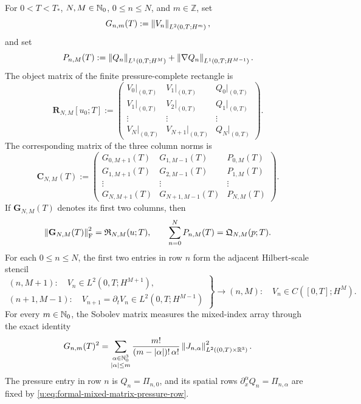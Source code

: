 \begin{proposition}
\label{u:prop:sobolev-rectangle-matrix}
For \(0<T<T_*\), \(N,M\in\mathbb N_0\), \(0\le n\le N\), and
\(m\in\mathbb Z\), set
\[
 G_{n,m}(T):=\left\lVert V_n\right\rVert_{L^2(0,T;H^m)},
\]
and set
\[
 P_{n,M}(T):=\left\lVert Q_n\right\rVert_{L^1(0,T;H^M)}
 +\left\lVert \nabla Q_n\right\rVert_{L^1(0,T;H^{M-1})}.
\]
The object matrix of the finite pressure-complete rectangle is
\begin{equation}
 \mathbf R_{N,M}[u_0;T]
 :=
 \begin{pmatrix}
  V_0|_{(0,T)}&V_1|_{(0,T)}&Q_0|_{(0,T)}\\
  V_1|_{(0,T)}&V_2|_{(0,T)}&Q_1|_{(0,T)}\\
  \vdots&\vdots&\vdots\\
  V_N|_{(0,T)}&V_{N+1}|_{(0,T)}&Q_N|_{(0,T)}
 \end{pmatrix}.
 \label{u:eq:finite-rectangle-object-matrix}
\end{equation}
The corresponding matrix of the three column norms is
\begin{equation}
 \mathbf C_{N,M}(T)
 :=
 \begin{pmatrix}
  G_{0,M+1}(T)&G_{1,M-1}(T)&P_{0,M}(T)\\
  G_{1,M+1}(T)&G_{2,M-1}(T)&P_{1,M}(T)\\
  \vdots&\vdots&\vdots\\
  G_{N,M+1}(T)&G_{N+1,M-1}(T)&P_{N,M}(T)
 \end{pmatrix}.
 \label{u:eq:sobolev-pressure-complete-rectangle-matrix}
\end{equation}
If \(\mathbf G_{N,M}(T)\) denotes its first two columns, then
\begin{equation}
 \left\lVert \mathbf G_{N,M}(T)\right\rVert_{\mathrm F}^2
 =\mathfrak R_{N,M}(u;T),
 \qquad
 \sum_{n=0}^NP_{n,M}(T)=\mathfrak Q_{N,M}(p;T).
 \label{u:eq:rectangle-matrix-norm-identities}
\end{equation}
For each \(0\le n\le N\), the first two entries in row \(n\) form the
adjacent Hilbert-scale stencil
\begin{equation}
 \left.
 \begin{array}{c}
  (n,M+1):\quad V_n\in L^2(0,T;H^{M+1}),\\
  (n+1,M-1):\quad V_{n+1}=\partial_tV_n
                       \in L^2(0,T;H^{M-1})
 \end{array}
 \right\}
 \longrightarrow
 (n,M):\quad V_n\in C([0,T];H^M).
 \label{u:eq:rectangle-adjacent-stencil}
\end{equation}
For every \(m\in\mathbb N_0\), the Sobolev matrix measures the mixed-index array
through the exact identity
\begin{equation}
 G_{n,m}(T)^2
 =\sum_{\substack{\alpha\in\mathbb N_0^3\\|\alpha|\le m}}
   \frac{m!}{(m-|\alpha|)!\,\alpha!}
   \left\lVert J_{n,\alpha}\right\rVert_{L^2((0,T)\times\mathbb R^3)}^2.
 \label{u:eq:rectangle-mixed-index-sobolev-identity}
\end{equation}
The pressure entry in row \(n\) is \(Q_n=\Pi_{n,0}\), and its spatial rows
\(\partial_x^\alpha Q_n=\Pi_{n,\alpha}\) are fixed by
\eqref{u:eq:formal-mixed-matrix-pressure-row}.
\end{proposition}

